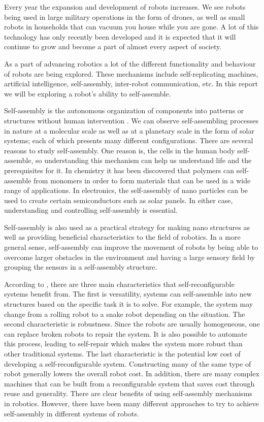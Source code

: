 Every year the expansion and development of robots increases. 
We see robots being used in large military operations in the form of drones, as well as small robots in households that can vacuum you house while you are gone.
A lot of this technology has only recently been developed and it is expected that it will continue to grow and become a part of almost every aspect of society.

As a part of advancing robotics a lot of the different functionality and behaviour of robots are being explored.
These mechanisms include self-replicating machines, artificial intelligence, self-assembly, inter-robot communication, etc.
In this report we will be exploring a robot's ability to self-assemble. 

Self-assembly is the autonomous organization of components into patterns or structures without human intervention \cite{whitesides_self-assembly_2002}.
We can observe self-assembling processes in nature at a molecular scale \cite{heylighen_science_2001} as well as at a planetary scale in the form of solar systems; each of which presents many different configurations.
There are several reasons to study self-assembly.
One reason is, the cells in the human body self-assemble, so understanding this mechanism can help us understand life and the prerequisites for it.
In chemistry it has been discovered that polymers can self-assemble from monomers in order to form materials that can be used in a wide range of applications\cite{chung_use_2004}\cite{siracusa_biodegradable_2008}. 
In electronics, the self-assembly of nano particles can be used to create certain semiconductors such as solar panels\cite{henini_chapter_2008}.
In either case, understanding and controlling self-assembly is essential.

Self-assembly is also used as a practical strategy for making nano structures as well as providing beneficial characteristics to the field of robotics.
In a more general sense, self-assembly can improve the movement of robots by being able to overcome larger obstacles in the environment and having a large sensory field by grouping the sensors in a self-assembly structure.

According to \cite{yim_modular_2007}, there are three main characteristics that self-reconfigurable systems benefit from.
The first is versatility, systems can self-assemble into new structures based on the specific task it is to solve.
For example, the system may change from a rolling robot to a snake robot depending on the situation.
The second characteristic is robustness.
Since the robots are usually homogeneous, one can replace broken robots to repair the system.
It is also possible to automate this process, leading to self-repair which makes the system more robust than other traditional systems.
The last characteristic is the potential low cost of developing a self-reconfigurable system.
Constructing many of the same type of robot generally lowers the overall robot cost.
In addition, there are many complex machines that can be built from  a reconfigurable system that saves cost through reuse and generality.
There are clear benefits of using self-assembly mechanisms in robotics.
However, there have been many different approaches to try to achieve self-assembly in different systems of robots.

